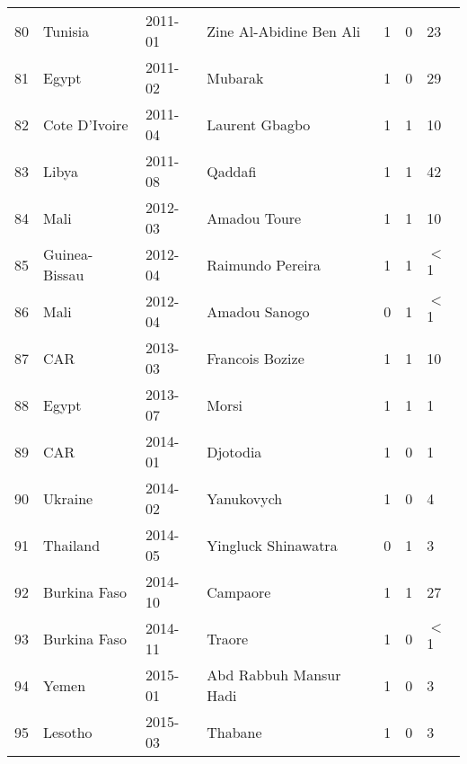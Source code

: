 \begin{table}[ht]
\begin{tabular}{rlllrrl}
  80 & Tunisia & 2011-01 & Zine Al-Abidine Ben Ali & 1 & 0 & 23 \\ 
  81 & Egypt & 2011-02 & Mubarak & 1 & 0 & 29 \\ 
  82 & Cote D'Ivoire & 2011-04 & Laurent Gbagbo & 1 & 1 & 10 \\ 
  83 & Libya & 2011-08 & Qaddafi & 1 & 1 & 42 \\ 
  84 & Mali & 2012-03 & Amadou Toure & 1 & 1 & 10 \\ 
  85 & Guinea-Bissau & 2012-04 & Raimundo Pereira & 1 & 1 & $<$1 \\ 
  86 & Mali & 2012-04 & Amadou Sanogo & 0 & 1 & $<$1 \\ 
  87 & CAR & 2013-03 & Francois Bozize & 1 & 1 & 10 \\ 
  88 & Egypt & 2013-07 & Morsi & 1 & 1 & 1 \\ 
  89 & CAR & 2014-01 & Djotodia & 1 & 0 & 1 \\ 
  90 & Ukraine & 2014-02 & Yanukovych & 1 & 0 & 4 \\ 
  91 & Thailand & 2014-05 & Yingluck Shinawatra & 0 & 1 & 3 \\ 
  92 & Burkina Faso & 2014-10 & Campaore & 1 & 1 & 27 \\ 
  93 & Burkina Faso & 2014-11 & Traore & 1 & 0 & $<$1 \\ 
  94 & Yemen & 2015-01 & Abd Rabbuh Mansur Hadi & 1 & 0 & 3 \\ 
  95 & Lesotho & 2015-03 & Thabane & 1 & 0 & 3 \\ 
   \hline
\end{tabular}
\end{table}
